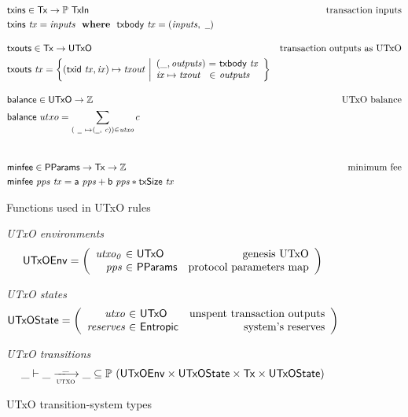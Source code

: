 \begin{figure}
  \begin{align*}
    & \fun{txins} \in \Tx \to \powerset{\TxIn}
    & \text{transaction inputs} \\
    & \txins{tx} = \var{inputs} \where \txbody{tx} = (\var{inputs}, ~\wcard)
    \nextdef
    & \fun{txouts} \in \Tx \to \UTxO
    & \text{transaction outputs as UTxO} \\
    & \fun{txouts} ~ \var{tx} =
      \left\{ (\fun{txid} ~ \var{tx}, \var{ix}) \mapsto \var{txout} ~
      \middle| \begin{array}{l@{~}c@{~}l}
                 (\_, \var{outputs}) & = & \txbody{tx} \\
                 \var{ix} \mapsto \var{txout} & \in & \var{outputs}
               \end{array}
      \right\}
    \nextdef
    & \fun{balance} \in \UTxO \to \mathbb{Z}
    & \text{UTxO balance} \\
    & \fun{balance} ~ utxo = \sum_{(~\wcard ~ \mapsto (\wcard, ~c)) \in \var{utxo}} c\\
   \nextdef
    & \fun{minfee} \in \PPMMap \to \Tx \to \mathbb{Z} & \text{minimum fee}\\
    & \fun{minfee}~\var{pps}~\var{tx} =
      \fun{a}~\var{pps} + \fun{b}~\var{pps} * \fun{txSize}~\var{tx}
  \end{align*}
  \caption{Functions used in UTxO rules}
  \label{fig:derived-defs:utxo}
\end{figure}

\begin{figure}
  \emph{UTxO environments}
  \begin{equation*}
    \UTxOEnv =
    \left(
      \begin{array}{r@{~\in~}lr}
        \var{utxo_0} & \UTxO & \text{genesis UTxO}\\
        \var{pps} & \PPMMap & \text{protocol parameters map}
      \end{array}
    \right)
  \end{equation*}

  \emph{UTxO states}
  \begin{equation*}
    \UTxOState =
    \left(
      \begin{array}{r@{~\in~}lr}
        \var{utxo} & \UTxO & \text{unspent transaction outputs}\\
        \var{reserves} & \Entropic & \text{system's reserves}
      \end{array}
    \right)
  \end{equation*}

  \emph{UTxO transitions}
  \begin{equation*}
    \_ \vdash
    \var{\_} \trans{utxo}{\_} \var{\_}
    \subseteq \powerset (\UTxOEnv \times \UTxOState \times \Tx \times \UTxOState)
  \end{equation*}
  \caption{UTxO transition-system types}
  \label{fig:ts-types:utxo}
\end{figure}

